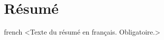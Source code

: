 \chapter*{Résumé}               %
\label{chap:resume}             %

\begin{otherlanguage*}{french}
  <Texte du résumé en français. Obligatoire.>
\end{otherlanguage*}
